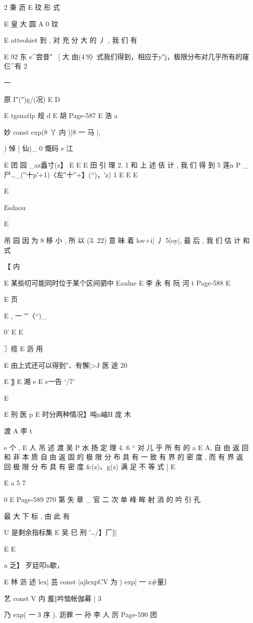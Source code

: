 {{2 秉 沥 E
玟
形 式

E 皇 大 圆 A
0
玟

E atteohiet
到 , 对 充 分 大 的 丿 , 我 们 有

E 92 东 e^尝昔″~ [ 大
由(4'9〉式我们得到，相应于y″j，极限分布对几乎所有的窿仨^有
2

一

原
I″(″)g/(况) E D

E tgsnatlp 规 d
E 胡
Page-587
E 浩 a

妙 const exp(8 丫 内 )|8 一 马 |,

) 悼 [ 仙)_
0 慨码 e
江

E
团 园
_az矗寸(z】 E
E
E
田 引 理 2. 1 和 上 述 佶 计 , 我 们 得 到
5 莲n
P _尸…_(′′十p′+1)〈左′′十′′+】(“)，′z) 1
E
E
E

E

Esdaou

E

吊 园
因 为 8 移 小 , 所 以 (3. 22) 意 昧 着 lov+i| 丿 5|oy|, 最 后 , 我 们 估 计
和 式

【
内

E 某些叨可能同时位于某个区间驷中 Eaulne
E 李 永 有 阮 河 t
Page-588
E

E 页

E
, 一
″′〈“)_{0' E
E

〗缆 E 沥 用

E 由上式还可以得到″、有懈|>J 医 途
20

E 〗 E 湘 e E e一告 `/7'

E

E 刑 医 p
E 时分两种情况】吨n岫H 庞 木

渡 A 李 t

e 个 ,
E 人 吊 述 渡 吴 P 水 扬
定 理 4. 6 “ 对 儿 乎 所 有 的 a E A, 自 由 返 回 和 非 本 质 自 由 返 固
的 极 限 分 布 具 有 一 致 有 界 的 密 度 , 而 有 界 返 回 极 限 分 布 具 有 密 度
&(z)、g(z) 满 足 不 等 式
[ E

E a
5 7

0
E
Page-589
270 第 失 章 _ 官 二 次 单 峰 眸 射 消 的 吟 引 孔

最 大 下 标 , 由 此 有

U 是剩余指标集 E
吴 巳 刑
′…/】厂‖|

E
E

a 乏】 歹廷叩n歇，

E 林 沥 述
lex| 芸 const |ajlexpCV 为 ) exp| 一 z#量〕

艺 const V 内 羞‖吟恤帐伽募 |
3

乃 exp( 一 3 序 ).
沥罪 一 孙 李 人 厉
Page-590
团

}}}
